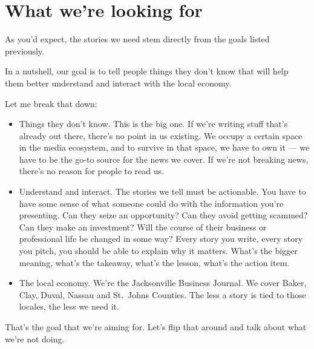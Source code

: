 \documentclass[
  11pt,
  american,
  letterpaperpaper,
  extrafontsizes,onecolumn,openright
  ]{memoir}
\providecommand{\tightlist}{%
  \setlength{\itemsep}{0pt}\setlength{\parskip}{0pt}}
\begin{document}
\hypertarget{what-were-looking-for}{%
\section*{What we're looking for}\label{what-were-looking-for}}

As you'd expect, the stories we need stem directly from the goals listed previously.

In a nutshell, our goal is to tell people things they don't know that will help them better understand and interact with the local economy.

Let me break that down:

\begin{itemize}
\tightlist
\item
  Things they don't know. This is the big one. If we're writing stuff that's already out there, there's no point in us existing. We occupy a certain space in the media ecosystem, and to survive in that space, we have to own it --- we have to be the go-to source for the news we cover. If we're not breaking news, there's no reason for people to read us.
\item
  Understand and interact. The stories we tell must be actionable. You have to have some sense of what someone could do with the information you're presenting. Can they seize an opportunity? Can they avoid getting scammed? Can they make an investment? Will the course of their business or professional life be changed in some way? Every story you write, every story you pitch, you should be able to explain why it matters. What's the bigger meaning, what's the takeaway, what's the lesson, what's the action item.
\item
  The local economy. We're the Jacksonville Business Journal. We cover Baker, Clay, Duval, Nassau and St.~Johns Counties. The less a story is tied to those locales, the less we need it.
\end{itemize}

That's the goal that we're aiming for. Let's flip that around and talk about what we're not doing.
\end{document}
